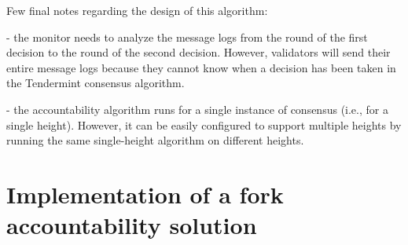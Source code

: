 \documentclass[a4paper,11pt,oneside]{report}
\begin{document}
\begin{markdown}
Few final notes regarding the design of this algorithm:

- the monitor needs to analyze the message logs from the round of the first decision to the round of the second decision. However, validators will send their entire message logs because they cannot know when a decision has been taken in the Tendermint consensus algorithm. 

- the accountability algorithm runs for a single instance of consensus (i.e., for a single height). However, it can be easily configured to support multiple heights by running the same single-height algorithm on different heights. 

\end{markdown}

\chapter{Implementation of a fork accountability solution}
\end{document}
